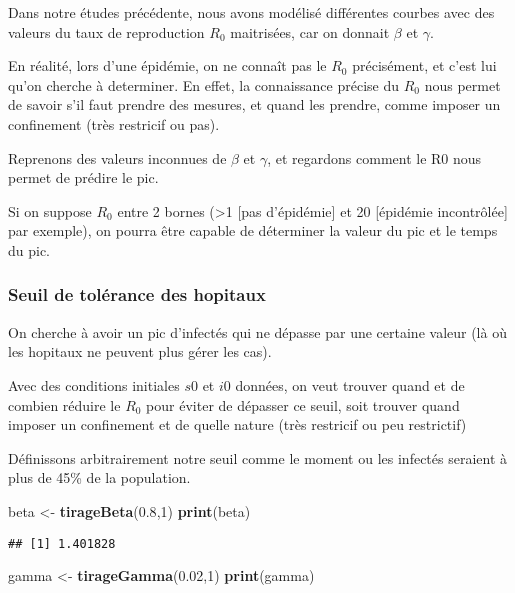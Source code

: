 \documentclass[
]{article}
\newenvironment{Shaded}{\begin{snugshade}}{\end{snugshade}}
\newcommand{\DecValTok}[1]{\textcolor[rgb]{0.00,0.00,0.81}{#1}}
\newcommand{\FloatTok}[1]{\textcolor[rgb]{0.00,0.00,0.81}{#1}}
\newcommand{\KeywordTok}[1]{\textcolor[rgb]{0.13,0.29,0.53}{\textbf{#1}}}
\newcommand{\NormalTok}[1]{#1}
\newcommand{\StringTok}[1]{\textcolor[rgb]{0.31,0.60,0.02}{#1}}
\begin{document}
Dans notre études précédente, nous avons modélisé différentes courbes
avec des valeurs du taux de reproduction \(R_0\) maitrisées, car on
donnait \(\beta\) et \(\gamma\).

En réalité, lors d'une épidémie, on ne connaît pas le \(R_0\)
précisément, et c'est lui qu'on cherche à determiner. En effet, la
connaissance précise du \(R_0\) nous permet de savoir s'il faut prendre
des mesures, et quand les prendre, comme imposer un confinement (très
restricif ou pas).

Reprenons des valeurs inconnues de \(\beta\) et \(\gamma\), et regardons
comment le R0 nous permet de prédire le pic.

Si on suppose \(R_0\) entre 2 bornes (\textgreater1 {[}pas d'épidémie{]}
et 20 {[}épidémie incontrôlée{]} par exemple), on pourra être capable de
déterminer la valeur du pic et le temps du pic.

\hypertarget{seuil-de-toluxe9rance-des-hopitaux}{%
\subsubsection{Seuil de tolérance des
hopitaux}\label{seuil-de-toluxe9rance-des-hopitaux}}

On cherche à avoir un pic d'infectés qui ne dépasse par une certaine
valeur (là où les hopitaux ne peuvent plus gérer les cas).

Avec des conditions initiales \(s0\) et \(i0\) données, on veut trouver
quand et de combien réduire le \(R_0\) pour éviter de dépasser ce seuil,
soit trouver quand imposer un confinement et de quelle nature (très
restricif ou peu restrictif)

Définissons arbitrairement notre seuil comme le moment ou les infectés
seraient à plus de 45\% de la population.

\begin{Shaded}
\begin{Highlighting}[]
\NormalTok{beta <-}\StringTok{ }\KeywordTok{tirageBeta}\NormalTok{(}\FloatTok{0.8}\NormalTok{,}\DecValTok{1}\NormalTok{)}
\KeywordTok{print}\NormalTok{(beta)}
\end{Highlighting}
\end{Shaded}

\begin{verbatim}
## [1] 1.401828
\end{verbatim}

\begin{Shaded}
\begin{Highlighting}[]
\NormalTok{gamma <-}\StringTok{ }\KeywordTok{tirageGamma}\NormalTok{(}\FloatTok{0.02}\NormalTok{,}\DecValTok{1}\NormalTok{)}
\KeywordTok{print}\NormalTok{(gamma)}
\end{Highlighting}
\end{Shaded}
\end{document}
